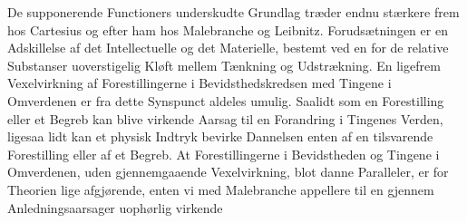 \documentclass[12pt]{book}
\begin{document}
De supponerende Functioners underskudte Grundlag træder
endnu stærkere frem hos Cartesius og efter ham hos Malebranche
og Leibnitz. Forudsætningen er en Adskillelse af det
Intellectuelle og det Materielle, bestemt ved en for de relative
Substanser uoverstigelig Kløft mellem Tænkning og Udstrækning.
En ligefrem Vexelvirkning af Forestillingerne i Bevidsthedskredsen
med Tingene i Omverdenen er fra dette Synspunct
aldeles umulig. Saalidt som en Forestilling eller et
Begreb kan blive virkende Aarsag til en Forandring i Tingenes
Verden, ligesaa lidt kan et physisk Indtryk bevirke Dannelsen
enten af en tilsvarende Forestilling eller af et Begreb. At
Forestillingerne i Bevidstheden og Tingene i Omverdenen,
uden gjennemgaaende Vexelvirkning, blot danne Paralleler, er
for Theorien lige afgjørende, enten vi med Malebranche
appellere til en gjennem Anledningsaarsager uophørlig virkende
\end{document}
